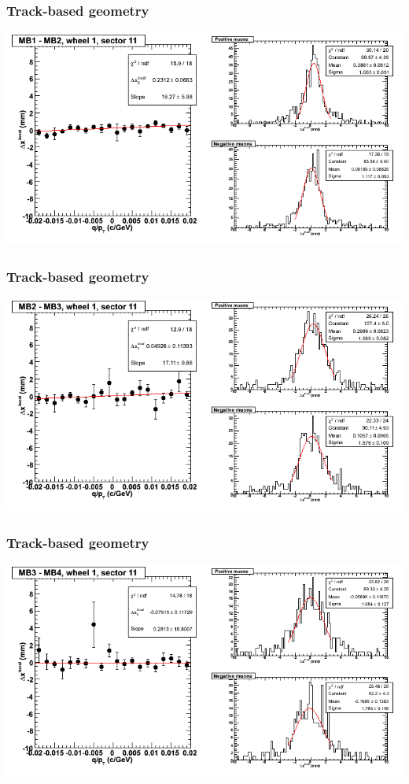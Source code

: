 \documentclass[compress]{beamer}
\begin{document}
\begin{frame}
\frametitle{Track-based geometry}
\includegraphics[width=\linewidth]{NOV4_segdiffs/dt13_resid_D_11_12.png}
\end{frame}

\begin{frame}
\frametitle{Track-based geometry}
\includegraphics[width=\linewidth]{NOV4_segdiffs/dt13_resid_D_11_23.png}
\end{frame}

\begin{frame}
\frametitle{Track-based geometry}
\includegraphics[width=\linewidth]{NOV4_segdiffs/dt13_resid_D_11_34.png}
\end{frame}
\end{document}
